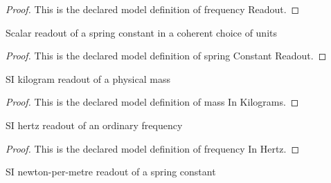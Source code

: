 \begin{proof}
  This is the declared model definition of frequency Readout.
\end{proof}
\begin{definition}
  \label{def:physics:phyx-mini-0207:phyxminiproblems-problemphyxmini0207-springconstantreadout}
  Scalar readout of a spring constant in a coherent choice of units
\end{definition}
\begin{proof}
  This is the declared model definition of spring Constant Readout.
\end{proof}
\begin{definition}
  \label{def:physics:phyx-mini-0207:phyxminiproblems-problemphyxmini0207-massinkilograms}
  SI kilogram readout of a physical mass
\end{definition}
\begin{proof}
  This is the declared model definition of mass In Kilograms.
\end{proof}
\begin{definition}
  \label{def:physics:phyx-mini-0207:phyxminiproblems-problemphyxmini0207-frequencyinhertz}
  SI hertz readout of an ordinary frequency
\end{definition}
\begin{proof}
  This is the declared model definition of frequency In Hertz.
\end{proof}
\begin{definition}
  \label{def:physics:phyx-mini-0207:phyxminiproblems-problemphyxmini0207-springconstantinnewtonspermeter}
  SI newton-per-metre readout of a spring constant
\end{definition}
